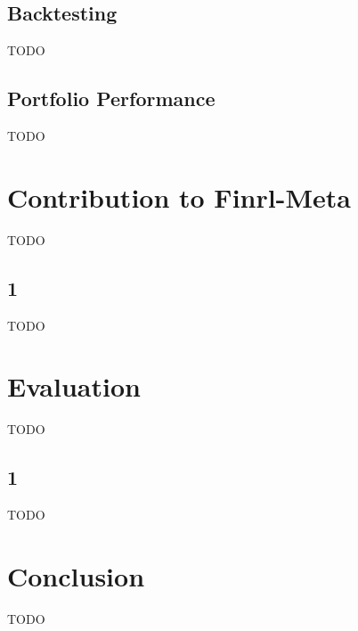 \section{Backtesting}\label{sec:backtesting}
TODO


\section{Portfolio Performance}\label{sec:portfolio-performance}
TODO




\chapter{Contribution to Finrl-Meta}\label{ch:contribution-to-finrl-meta}
TODO


\section{1}\label{sec:1}
TODO



\chapter{Evaluation}\label{ch:evaluation}
TODO


\section{1}\label{sec:12}
TODO



\chapter{Conclusion}\label{ch:conclusion}
TODO
